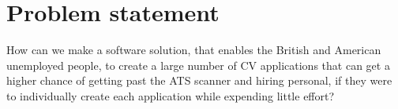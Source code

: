 \section{Problem statement}\label{sec:problem}
How can we make a software solution, that enables the British and American unemployed people, 
to create a large number of CV applications 
that can get a higher chance of getting past the ATS scanner and hiring personal, 
if they were to individually create each application while expending little effort? 